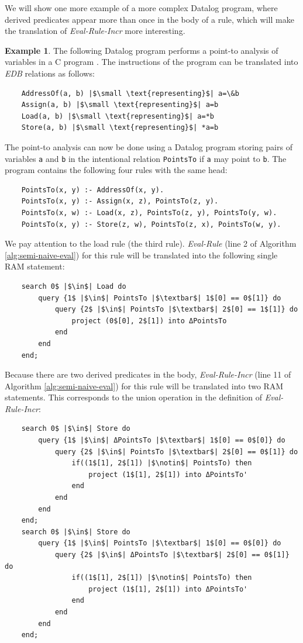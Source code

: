 \documentclass[11pt]{report}
\theoremstyle{definition}
\newtheorem{exmp}{Example}[chapter]
\begin{document}
We will show one more example of a more complex Datalog program, where derived predicates appear more than once in the body of a rule, which will make the translation of \textit{Eval-Rule-Incr} more interesting.

\begin{exmp}
  The following Datalog program performs a point-to analysis of variables in a C program \cite{PGL-014}. The instructions of the program can be translated into \textit{EDB} relations as follows:
  \begin{verbatim}
    AddressOf(a, b) |$\small \text{representing}$| a=\&b
    Assign(a, b) |$\small \text{representing}$| a=b
    Load(a, b) |$\small \text{representing}$| a=*b
    Store(a, b) |$\small \text{representing}$| *a=b
  \end{verbatim}
  The point-to analysis can now be done using a Datalog program storing pairs of variables \texttt{a} and \texttt{b} in the intentional relation \texttt{PointsTo} if \texttt{a} may point to \texttt{b}. The program contains the following four rules with the same head:
  \begin{verbatim}
    PointsTo(x, y) :- AddressOf(x, y).
    PointsTo(x, y) :- Assign(x, z), PointsTo(z, y).
    PointsTo(x, w) :- Load(x, z), PointsTo(z, y), PointsTo(y, w).
    PointsTo(x, y) :- Store(z, w), PointsTo(z, x), PointsTo(w, y).
  \end{verbatim}
  We pay attention to the load rule (the third rule). \textit{Eval-Rule} (line 2 of Algorithm \ref{alg:semi-naive-eval}) for this rule will be translated into the following single RAM statement:
  \begin{verbatim}
    search 0$ |$\in$| Load do
        query {1$ |$\in$| PointsTo |$\textbar$| 1$[0] == 0$[1]} do
            query {2$ |$\in$| PointsTo |$\textbar$| 2$[0] == 1$[1]} do
                project (0$[0], 2$[1]) into ΔPointsTo
            end
        end
    end;
  \end{verbatim}
  Because there are two derived predicates in the body, \textit{Eval-Rule-Incr} (line 11 of Algorithm \ref{alg:semi-naive-eval}) for this rule will be translated into two RAM statements. This corresponds to the union operation in the definition of \textit{Eval-Rule-Incr}:
  \begin{verbatim}
    search 0$ |$\in$| Store do
        query {1$ |$\in$| ΔPointsTo |$\textbar$| 1$[0] == 0$[0]} do
            query {2$ |$\in$| PointsTo |$\textbar$| 2$[0] == 0$[1]} do
                if((1$[1], 2$[1]) |$\notin$| PointsTo) then
                    project (1$[1], 2$[1]) into ΔPointsTo'
                end
            end
        end
    end;
    search 0$ |$\in$| Store do
        query {1$ |$\in$| PointsTo |$\textbar$| 1$[0] == 0$[0]} do
            query {2$ |$\in$| ΔPointsTo |$\textbar$| 2$[0] == 0$[1]} do
                if((1$[1], 2$[1]) |$\notin$| PointsTo) then
                    project (1$[1], 2$[1]) into ΔPointsTo'
                end
            end
        end
    end;
  \end{verbatim}
\end{exmp}
\label{exmp:point-to}
\end{document}
